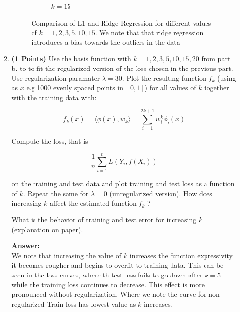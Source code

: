 \documentclass{./tufte-handout}
\begin{document}
\begin{enumerate}[(a)]
\begin{enumerate}
\begin{figure}[!ht]
\begin{subfigure}[b]{.5\textwidth}
          \caption{$k=15$}
        \end{subfigure}
        \hfill
        \caption{Comparison of L1 and Ridge Regression for different values of $k=1,2,3,5,10,15$. We note 
        that that ridge regression introduces a bias towards the outliers in the data}
    \end{figure}
    \FloatBarrier
    \item \textbf{(1 Points)} Use the basis function with $k=1, 2, 3, 5, 10, 15, 20$ from part b. to 
   to fit the regularized version of the loss chosen in the previous part. Use regularization paramater 
   $\lambda = 30$. Plot the resulting function $f_k$ (using as $x$ e.g 1000 evenly spaced points in $[0, 1]$) 
   for all values of $k$ together with the training data with: 

   \begin{equation}
        f_k(x)  = \langle \phi(x), w_k \rangle = \sum_{i=1}^{2k+1} w_i^k \phi_{i}(x)
   \end{equation}

   Compute the loss, that is 

   \begin{equation}
    \frac{1}{n}  \sum_{i=1}^n L(Y_i, f(X_i))
   \end{equation}

   on the training and test data and plot training and test loss as a function of $k$.
   Repeat the same for $\lambda =0$ (unregularized version). How does increasing 
   $k$ affect the estimated function $f_k$ ? 

   What is the behavior of training and test error for increasing 
   $k$ (explanation on paper). 

   \textbf{Answer:} \\

   We note that increasing the value of $k$ increases the function expressivity it 
   becomes rougher and begins to overfit to training data. This can be seen in 
   the loss curves, where th test loss fails to go down after $k=5$ while the training
   loss continues to decrease. This effect is more pronounced without regularization. 
   Where we note the curve for non-regularized Train loss has lowest value as $k$ 
   increases.
   

\end{enumerate}
\end{enumerate}
\end{document}
